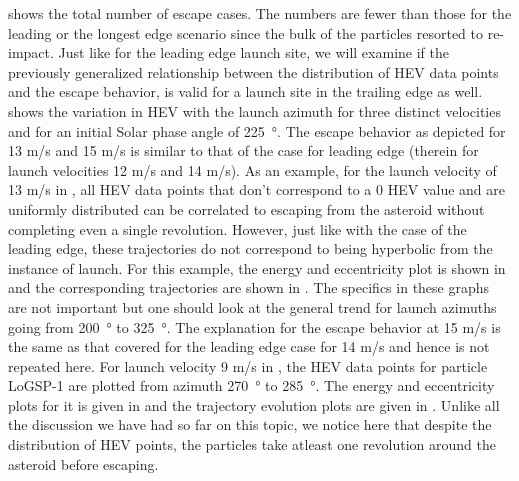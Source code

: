 \FloatBarrier
 shows the total number of escape cases. The numbers are fewer than those for the leading or the longest edge scenario since the bulk of the particles resorted to re-impact. Just like for the leading edge launch site, we will examine if the previously generalized relationship between the distribution of \gls{HEV} data points and the escape behavior, is valid for a launch site in the trailing edge as well.  shows the variation in \gls{HEV} with the launch azimuth for three distinct velocities and for an initial Solar phase angle of \SI{225}{\degree}. The escape behavior as depicted for 13 m/s and 15 m/s is similar to that of the case for leading edge (therein for launch velocities 12 m/s and 14 m/s). As an example, for the launch velocity of 13 m/s in , all \gls{HEV} data points that don't correspond to a 0 \gls{HEV} value and are uniformly distributed can be correlated to escaping from the asteroid without completing even a single revolution. However, just like with the case of the leading edge, these trajectories do not correspond to being hyperbolic from the instance of launch. For this example, the energy and eccentricity plot is shown in  and the corresponding trajectories are shown in . The specifics in these graphs are not important but one should look at the general trend for launch azimuths going from \SI{200}{\degree} to \SI{325}{\degree}. The explanation for the escape behavior at 15 m/s is the same as that covered for the leading edge case for 14 m/s and hence is not repeated here. For launch velocity 9 m/s in , the \gls{HEV} data points for particle LoGSP-1 are plotted from azimuth \SI{270}{\degree} to \SI{285}{\degree}. The energy and eccentricity plots for it is given in  and the trajectory evolution plots are given in . Unlike all the discussion we have had so far on this topic, we notice here that despite the distribution of \gls{HEV} points, the particles take atleast one revolution around the asteroid before escaping.
